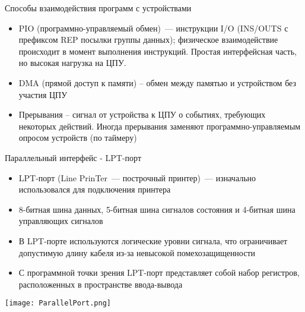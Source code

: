 \documentclass[aspectratio=169,14pt]{beamer}
\begin{document}
\begin{frame}{Способы взаимодействия программ с устройствами}
    \begin{itemize}
        \item PIO (программно-управляемый обмен)~--- инструкции I/O
        (INS/OUTS с префиксом REP посылки группы данных); физическое
        взаимодействие происходит в момент выполнения инструкций.
        Простая интерфейсная часть, но высокая нагрузка на ЦПУ.
        \item DMA (прямой доступ к памяти) – обмен между памятью и
        устройством без участия ЦПУ
        \item Прерывания – сигнал от устройства к ЦПУ о событиях,
        требующих некоторых действий. Иногда прерывания заменяют
        программно-управляемым опросом устройств (по таймеру)
    \end{itemize}
\end{frame}

\begin{frame}{Параллельный интерфейс - LPT-порт}
    \begin{spacing}{0.8}
        \begin{itemize}
            \item LPT-порт (Line PrinTer~--- построчный принтер)~--- изначально
            использовался для подключения принтера
            \item 8-битная шина данных, 5-битная шина сигналов состояния
            и 4-битная шина управляющих сигналов
            \item В LPT-порте используются логические уровни сигнала,
            что ограничивает допустимую длину кабеля из-за невысокой
            помехозащищенности
            \item С программной точки зрения LPT-порт представляет собой
            набор регистров, расположенных в пространстве ввода-вывода
        \end{itemize}
        \texttt{[image: ParallelPort.png]}
    \end{spacing}
\end{frame}
\end{document}
